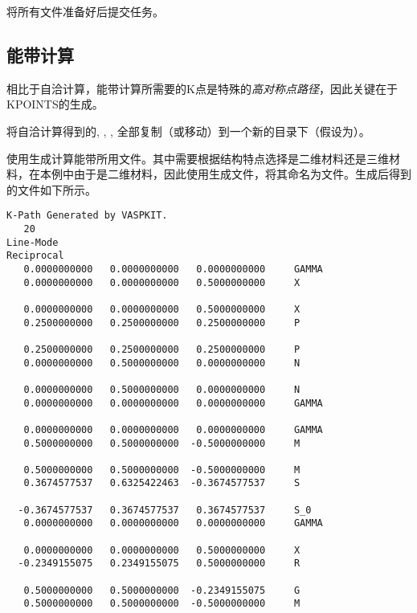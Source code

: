 将所有文件准备好后提交任务。

\subsection{能带计算}\label{subsec:VASP计算能带过程-能带计算}

相比于自洽计算，能带计算所需要的K点是特殊的\emph{高对称点路径}，因此关键在于KPOINTS的生成。

将自洽计算得到的, , , 全部复制（或移动）到一个新的目录下（假设为）。

使用生成计算能带所用文件。其中需要根据结构特点选择是二维材料还是三维材料，在本例中由于是二维材料，因此使用生成文件，将其命名为文件。生成后得到的文件如下所示。

\begin{lstlisting}[caption=KPOINTS]
K-Path Generated by VASPKIT.
   20
Line-Mode
Reciprocal
   0.0000000000   0.0000000000   0.0000000000     GAMMA          
   0.0000000000   0.0000000000   0.5000000000     X              
 
   0.0000000000   0.0000000000   0.5000000000     X              
   0.2500000000   0.2500000000   0.2500000000     P              
 
   0.2500000000   0.2500000000   0.2500000000     P              
   0.0000000000   0.5000000000   0.0000000000     N              
 
   0.0000000000   0.5000000000   0.0000000000     N              
   0.0000000000   0.0000000000   0.0000000000     GAMMA          
 
   0.0000000000   0.0000000000   0.0000000000     GAMMA          
   0.5000000000   0.5000000000  -0.5000000000     M              
 
   0.5000000000   0.5000000000  -0.5000000000     M              
   0.3674577537   0.6325422463  -0.3674577537     S              
 
  -0.3674577537   0.3674577537   0.3674577537     S_0            
   0.0000000000   0.0000000000   0.0000000000     GAMMA          
 
   0.0000000000   0.0000000000   0.5000000000     X              
  -0.2349155075   0.2349155075   0.5000000000     R              
 
   0.5000000000   0.5000000000  -0.2349155075     G              
   0.5000000000   0.5000000000  -0.5000000000     M              
\end{lstlisting}


